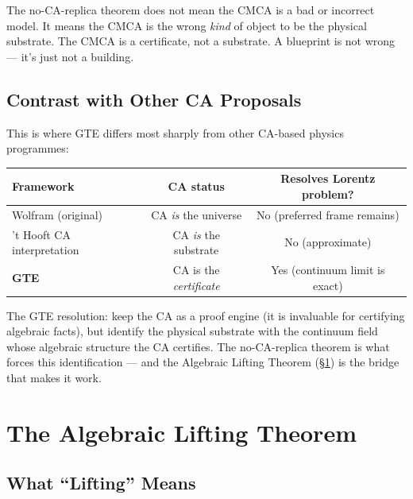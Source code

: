 \documentclass[11pt,a4paper]{article}
\theoremstyle{definition}
\begin{document}
\begin{tcolorbox}[colback=boxblue,colframe=blue!40!black,
  title={Important: the CMCA is not ``wrong'' --- it is \emph{not the substrate}}]
The no-CA-replica theorem does not mean the CMCA is a bad or incorrect model.
It means the CMCA is the wrong \emph{kind} of object to be the physical substrate.
The CMCA is a certificate, not a substrate.
A blueprint is not wrong --- it's just not a building.
\end{tcolorbox}

\subsection{Contrast with Other CA Proposals}

This is where GTE differs most sharply from other CA-based physics programmes:

\medskip
\begin{center}
\begin{tabular}{@{}lcc@{}}
\toprule
\textbf{Framework} & \textbf{CA status} & \textbf{Resolves Lorentz problem?} \\
\midrule
Wolfram (original) & CA \emph{is} the universe & No (preferred frame remains) \\
't Hooft CA interpretation & CA \emph{is} the substrate & No (approximate) \\
\textbf{GTE} & CA is the \emph{certificate} & Yes (continuum limit is exact) \\
\bottomrule
\end{tabular}
\end{center}

\medskip\noindent
The GTE resolution: keep the CA as a proof engine (it is invaluable for
certifying algebraic facts), but identify the physical substrate with the
continuum field whose algebraic structure the CA certifies.
The no-CA-replica theorem is what forces this identification --- and the Algebraic
Lifting Theorem (§\ref{sec:lifting}) is the bridge that makes it work.

\section{The Algebraic Lifting Theorem}
\label{sec:lifting}

\subsection{What ``Lifting'' Means}
\end{document}
